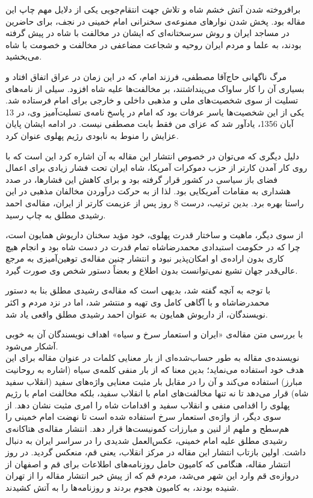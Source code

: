 \documentclass{article}
\begin{document}
برافروخته شدن آتش خشم شاه و تلاش جهت انتقام‌جویی یکی از دلایل مهم چاپ این مقاله بود. پخش شدن نوارهای ممنوعه‌ی سخنرانی امام خمینی در نجف، برای حاضرین در مساجد ایران و روش سرسختانه‌ای که ایشان در مخالفت با شاه در پیش گرفته بودند، به علما و مردم ایران روحیه و شجاعت مضاعفی در مخالفت و خصومت با شاه می‌بخشید.
\par
مرگ ناگهانی حاج‌آقا مصطفی، فرزند امام، که در این زمان در عراق اتفاق افتاد و بسیاری آن را کار ساواک می‌پنداشتند، بر مخالفت‌ها علیه شاه افزود. سیلی از نامه‌های تسلیت از سوی شخصیت‌های ملی و مذهبی داخلی و خارجی برای امام فرستاده شد. یکی از این شخصیت‌ها یاسر عرفات بود که امام در پاسخ نامه‌ی تسلیت‌آمیز وی، در 13 آبان‌ 1356، یادآور شد که عزای من فقط بابت مصطفی نیست. در ادامه ایشان پایان عزایش را منوط به نابودی رژیم پهلوی عنوان کرد.
\par
دلیل دیگری که می‌توان در خصوص انتشار این مقاله به آن اشاره کرد این است که با روی کار آمدن کارتر از حزب دموکرات آمریکا، شاه ایران تحت فشار زیادی برای اعمال فضای باز سیاسی در کشور قرار گرفته بود و برای کاهش این فشارها، در صدد هشداری به مقامات آمریکایی بود. لذا از به حرکت درآوردن مخالفان مذهبی در این راستا بهره برد. بدین ترتیب، درست 8 روز پس از عزیمت کارتر از ایران، مقاله‌ی احمد رشیدی مطلق به چاپ رسید.
\par
از سوی دیگر، ماهیت و ساختار قدرت پهلوی، خود مؤید سخنان داریوش همایون است، چرا که در حکومت استبدادی محمدرضاشاه تمام قدرت در دست شاه بود و انجام هیچ کاری بدون اراده‌ی او امکان‌پذیر نبود و انتشار چنین مقاله‌ی توهین‌آمیزی به مرجع عالی‌قدر جهان تشیع نمی‌توانست بدون اطلاع و بعضاً دستور شخص وی صورت گیرد.
\par
با توجه به آنچه گفته شد، بدیهی است که مقاله‌ی رشیدی مطلق بنا به دستور محمدرضاشاه و با آگاهی کامل وی تهیه و منتشر شد، اما در نزد مردم و اکثر نویسندگان، از داریوش همایون به عنوان احمد رشیدی مطلق واقعی یاد شد.
\par
با بررسی متن مقاله‌ی «ایران و استعمار سرخ و سیاه» اهداف نویسندگان آن به خوبی آشکار می‌شود. \\
نویسنده‌ی مقاله به طور حساب‌شده‌ای از بار معنایی کلمات در عنوان مقاله برای این هدف خود استفاده می‌نماید؛ بدین معنا که از بار منفی کلمه‌ی سیاه (اشاره به روحانیت مبارز) استفاده می‌کند و آن را در مقابل بار مثبت معنایی واژه‌های سفید (انقلاب سفید شاه) قرار می‌دهد تا نه تنها مخالفت‌های امام با انقلاب سفید، بلکه مخالفت امام با رژیم پهلوی را اقدامی منفی و انقلاب سفید و اقدامات شاه را امری مثبت نشان دهد. از سوی دیگر، از واژه‌ی استعمار سرخ استفاده شده است تا نهضت امام خمینی را هم‌سطح و ملهم از لنین و مبارزات کمونیست‌ها قرار دهد.
انتشار مقاله‌ی هتاکانه‌ی رشیدی مطلق علیه امام خمینی، عکس‌العمل شدیدی را در سراسر ایران به دنبال داشت. اولین بازتاب انتشار این مقاله در مرکز انقلاب، یعنی قم، منعکس گردید. در روز انتشار مقاله، هنگامی که کامیون حامل روزنامه‌های اطلاعات برای قم و اصفهان از دروازه‌ی قم وارد این شهر می‌شد، مردم قم که از پیش خبر انتشار مقاله را از تهران شنیده بودند، به کامیون هجوم بردند و روزنامه‌ها را به آتش کشیدند.
\end{document}
